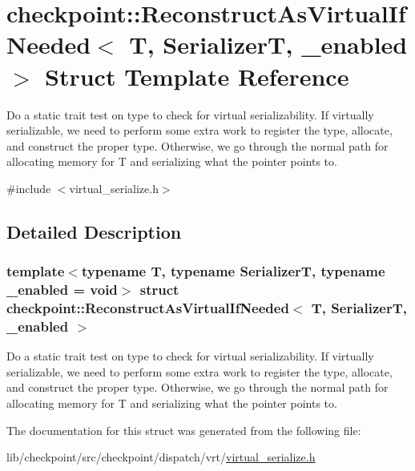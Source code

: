 \hypertarget{structcheckpoint_1_1_reconstruct_as_virtual_if_needed}{}\section{checkpoint\+:\+:Reconstruct\+As\+Virtual\+If\+Needed$<$ T, SerializerT, \+\_\+enabled $>$ Struct Template Reference}
\label{structcheckpoint_1_1_reconstruct_as_virtual_if_needed}


Do a static trait test on type to check for virtual serializability. If virtually serializable, we need to perform some extra work to register the type, allocate, and construct the proper type. Otherwise, we go through the normal path for allocating memory for T and serializing what the pointer points to.  




{\ttfamily \#include $<$virtual\+\_\+serialize.\+h$>$}



\subsection{Detailed Description}
\subsubsection*{template$<$typename T, typename SerializerT, typename \+\_\+enabled = void$>$\newline
struct checkpoint\+::\+Reconstruct\+As\+Virtual\+If\+Needed$<$ T, Serializer\+T, \+\_\+enabled $>$}

Do a static trait test on type to check for virtual serializability. If virtually serializable, we need to perform some extra work to register the type, allocate, and construct the proper type. Otherwise, we go through the normal path for allocating memory for T and serializing what the pointer points to. 

The documentation for this struct was generated from the following file\+:\begin{DoxyCompactItemize}
\item 
lib/checkpoint/src/checkpoint/dispatch/vrt/\hyperlink{virtual__serialize_8h}{virtual\+\_\+serialize.\+h}\end{DoxyCompactItemize}
